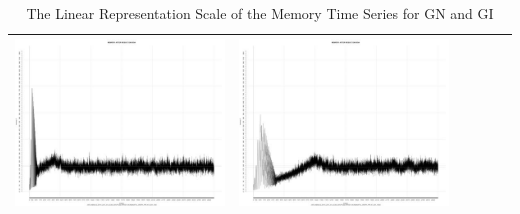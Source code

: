 \begin{table}[htbp]
{\begin{tabular}{l | ccccc}
\begin{minipage}{.15\textwidth}
     			 	\includegraphics[width=\linewidth]{images/mema-graph/I14}
    				 \end{minipage}
    			   &	 \begin{minipage}{.15\textwidth}
     			 	\includegraphics[width=\linewidth]{images/mema-graph/I15}
    				 \end{minipage}\\
		\hline %
	 \end{tabular}
	}
	\caption[\textsc{Analyser} Investigation Stack - Level 2 - Pattern Identification - Memory - Baselines GN and GI]{The Linear Representation Scale of the Memory Time Series for GN and GI} 
  	\label{tab:level2-memory-graph}
	\end{table}